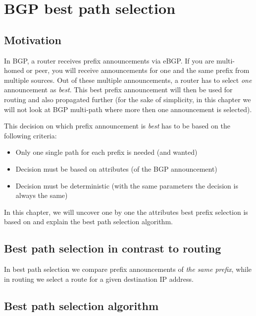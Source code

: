 \chapter{BGP best path selection}
\label{ch:bestpath}
\section{Motivation}
In BGP, a router receives prefix announcements via eBGP. If you are multi-homed or peer, you will receive announcements for one and the same prefix from multiple sources. Out of these multiple announcements, a router has to select \emph{one} announcement as \emph{best}. This best prefix announcement will then be used for routing and also propagated further (for the sake of simplicity, in this chapter we will not look at BGP multi-path where more then one announcement is selected).

This decision on which prefix announcement is \emph{best} has to be based on the following criteria:
\begin{itemize}
  \item Only one single path for each prefix is needed (and wanted)
  \item Decision must be based on attributes (of the BGP announcement)
  \item Decision must be deterministic (with the same parameters the decision is always the same)
\end{itemize}

In this chapter, we will uncover one by one the attributes best prefix selection is based on and explain the best path selection algorithm.

\section{Best path selection in contrast to routing}
In best path selection we compare prefix announcements of \emph{the same prefix}, while in routing we select a route for a given destination IP address.


\section{Best path selection algorithm}
